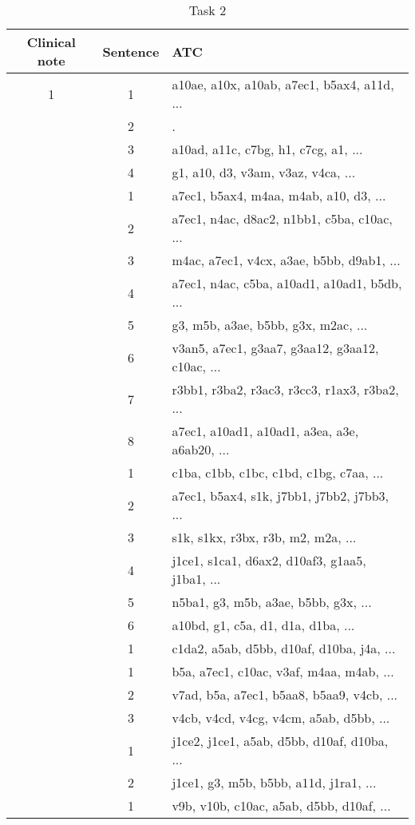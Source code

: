 \begin{table}[htbp] \footnotesize \center
\caption{Task 2\label{tab:task2}}
\begin{tabularx}{\textwidth}{c c X}
    \toprule
    Clinical note & Sentence & ATC \\
    \midrule
	1 & 1 & a10ae, a10x, a10ab, a7ec1, b5ax4, a11d, ... \\
	 & 2 & . \\
	 & 3 & a10ad, a11c, c7bg, h1, c7cg, a1, ... \\
	 & 4 & g1, a10, d3, v3am, v3az, v4ca, ... \\
	\addlinespace
	2 & 1 & a7ec1, b5ax4, m4aa, m4ab, a10, d3, ... \\
	 & 2 & a7ec1, n4ac, d8ac2, n1bb1, c5ba, c10ac, ... \\
	 & 3 & m4ac, a7ec1, v4cx, a3ae, b5bb, d9ab1, ... \\
	 & 4 & a7ec1, n4ac, c5ba, a10ad1, a10ad1, b5db, ... \\
	 & 5 & g3, m5b, a3ae, b5bb, g3x, m2ac, ... \\
	 & 6 & v3an5, a7ec1, g3aa7, g3aa12, g3aa12, c10ac, ... \\
	 & 7 & r3bb1, r3ba2, r3ac3, r3cc3, r1ax3, r3ba2, ... \\
	 & 8 & a7ec1, a10ad1, a10ad1, a3ea, a3e, a6ab20, ... \\
	\addlinespace
	3 & 1 & c1ba, c1bb, c1bc, c1bd, c1bg, c7aa, ... \\
	 & 2 & a7ec1, b5ax4, s1k, j7bb1, j7bb2, j7bb3, ... \\
	 & 3 & s1k, s1kx, r3bx, r3b, m2, m2a, ... \\
	 & 4 & j1ce1, s1ca1, d6ax2, d10af3, g1aa5, j1ba1, ... \\
	 & 5 & n5ba1, g3, m5b, a3ae, b5bb, g3x, ... \\
	 & 6 & a10bd, g1, c5a, d1, d1a, d1ba, ... \\
	\addlinespace
	4 & 1 & c1da2, a5ab, d5bb, d10af, d10ba, j4a, ... \\
	\addlinespace
	5 & 1 & b5a, a7ec1, c10ac, v3af, m4aa, m4ab, ... \\
	 & 2 & v7ad, b5a, a7ec1, b5aa8, b5aa9, v4cb, ... \\
	 & 3 & v4cb, v4cd, v4cg, v4cm, a5ab, d5bb, ... \\
	\addlinespace
	6 & 1 & j1ce2, j1ce1, a5ab, d5bb, d10af, d10ba, ... \\
	 & 2 & j1ce1, g3, m5b, b5bb, a11d, j1ra1, ... \\
	\addlinespace
	7 & 1 & v9b, v10b, c10ac, a5ab, d5bb, d10af, ... \\

\end{tabularx}
\end{table}
